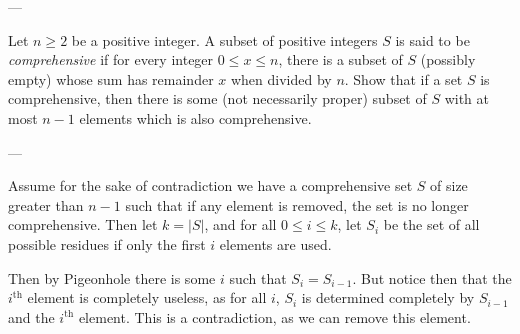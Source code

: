 
---

Let $n\ge2$ be a positive integer. A subset of positive integers $S$ is said to be \emph{comprehensive} if for every integer $0\le x\le n$, there is a subset of $S$ (possibly empty) whose sum has remainder $x$ when divided by $n$. Show that if a set $S$ is comprehensive, then there is some (not necessarily proper) subset of $S$ with at most $n-1$ elements which is also comprehensive.

---

Assume for the sake of contradiction we have a comprehensive set $S$ of size greater than $n-1$ such that if any element is removed, the set is no longer comprehensive. Then let $k=|S|$, and for all $0\le i\le k$, let $S_i$ be the set of all possible residues if only the first $i$ elements are used.

Then by Pigeonhole there is some $i$ such that $S_i=S_{i-1}$. But notice then that the $i^\text{th}$ element is completely useless, as for all $i$, $S_i$ is determined completely by $S_{i-1}$ and the $i^\text{th}$ element. This is a contradiction, as we can remove this element.

